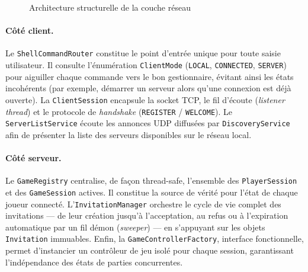 \documentclass[a4paper]{article}
\begin{document}
\begin{figure}[ht]
    \caption{Architecture structurelle de la couche réseau}
    \label{fig:architecture-serveur}
\end{figure}
 
 
\paragraph{Côté client.}
Le \texttt{ShellCommandRouter} constitue le point d'entrée unique pour toute
saisie utilisateur. Il consulte l'énumération \texttt{ClientMode}
(\texttt{LOCAL}, \texttt{CONNECTED}, \texttt{SERVER}) pour aiguiller chaque
commande vers le bon gestionnaire, évitant ainsi les états incohérents
(par exemple, démarrer un serveur alors qu'une connexion est déjà ouverte).
La \texttt{ClientSession} encapsule la socket TCP, le fil d'écoute
(\textit{listener thread}) et le protocole de \textit{handshake}
(\texttt{REGISTER} / \texttt{WELCOME}). Le \texttt{ServerListService} écoute
les annonces UDP diffusées par \texttt{DiscoveryService} afin de présenter
la liste des serveurs disponibles sur le réseau local.
 
\paragraph{Côté serveur.}
Le \texttt{GameRegistry} centralise, de façon thread-safe, l'ensemble des
\texttt{PlayerSession} et des \texttt{GameSession} actives. Il constitue
la source de vérité pour l'état de chaque joueur connecté. L'\texttt{InvitationManager}
orchestre le cycle de vie complet des invitations — de leur création jusqu'à
l'acceptation, au refus ou à l'expiration automatique par un fil démon
(\textit{sweeper}) — en s'appuyant sur les objets \texttt{Invitation}
immuables. Enfin, la \texttt{GameControllerFactory}, interface fonctionnelle,
permet d'instancier un contrôleur de jeu isolé pour chaque session, garantissant
l'indépendance des états de parties concurrentes.
\end{document}
